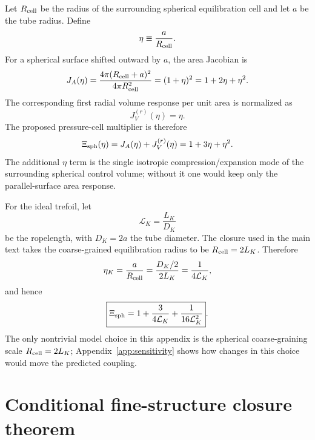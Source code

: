 \documentclass[aps,pra,preprint,longbibliography,nofootinbib]{revtex4-2}
\begin{document}
Let $R_{\rm cell}$ be the radius of the surrounding spherical equilibration
cell and let $a$ be the tube radius.  Define
\begin{equation}
  \eta\equiv \frac{a}{R_{\rm cell}} .
  \label{eq:app_eta_general}
\end{equation}
For a spherical surface shifted outward by $a$, the area Jacobian is
\begin{equation}
  J_A(\eta)
  =\frac{4\pi(R_{\rm cell}+a)^2}{4\pi R_{\rm cell}^2}
  =(1+\eta)^2
  =1+2\eta+\eta^2 .
  \label{eq:app_area_jacobian}
\end{equation}
The corresponding first radial volume response per unit area is normalized as
\begin{equation}
  J_V^{(r)}(\eta)=\eta .
  \label{eq:app_radial_volume}
\end{equation}
The proposed pressure-cell multiplier is therefore
\begin{equation}
  \Xi_{\rm sph}(\eta)=J_A(\eta)+J_V^{(r)}(\eta)
  =1+3\eta+\eta^2 .
  \label{eq:app_xi_general}
\end{equation}
The additional $\eta$ term is the single isotropic compression/expansion
mode of the surrounding spherical control volume; without it one would keep
only the parallel-surface area response.

For the ideal trefoil, let
\begin{equation}
  \mathcal L_K=\frac{L_K}{D_K}
  \label{eq:app_ropelength}
\end{equation}
be the ropelength, with $D_K=2a$ the tube diameter.  The closure used in the
main text takes the coarse-grained equilibration radius to be
$R_{\rm cell}=2L_K$.  Therefore
\begin{equation}
  \eta_K=\frac{a}{R_{\rm cell}}
  =\frac{D_K/2}{2L_K}
  =\frac{1}{4\mathcal L_K},
  \label{eq:app_eta_k}
\end{equation}
and hence
\begin{equation}
  \boxed{\Xi_{\rm sph}
  =1+\frac{3}{4\mathcal L_K}+\frac{1}{16\mathcal L_K^2}} .
  \label{eq:app_xi_k}
\end{equation}
The only nontrivial model choice in this appendix is the spherical
coarse-graining scale $R_{\rm cell}=2L_K$; Appendix~\ref{app:sensitivity}
shows how changes in this choice would move the predicted coupling.

\section{Conditional fine-structure closure theorem}
\label{app:alpha_theorem}
\end{document}
